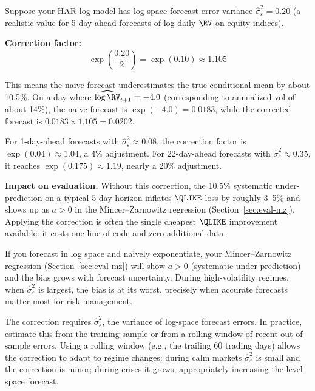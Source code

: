 \begin{workedexample}
Suppose your HAR-log model has log-space forecast error variance $\hat{\sigma}^2_\varepsilon = 0.20$ (a realistic value for 5-day-ahead forecasts of log daily $\RV$ on equity indices).

\textbf{Correction factor:}
\[
\exp\!\left(\frac{0.20}{2}\right) = \exp(0.10) \approx 1.105
\]

This means the naive forecast underestimates the true conditional mean by about 10.5\%.
On a day where $\widehat{\log \RV}_{t+1} = -4.0$ (corresponding to annualized vol of about 14\%), the naive forecast is $\exp(-4.0) = 0.0183$, while the corrected forecast is $0.0183 \times 1.105 = 0.0202$.

For 1-day-ahead forecasts with $\hat{\sigma}^2_\varepsilon \approx 0.08$, the correction factor is $\exp(0.04) \approx 1.04$, a 4\% adjustment.
For 22-day-ahead forecasts with $\hat{\sigma}^2_\varepsilon \approx 0.35$, it reaches $\exp(0.175) \approx 1.19$, nearly a 20\% adjustment.

\textbf{Impact on evaluation.}
Without this correction, the 10.5\% systematic under-prediction on a typical 5-day horizon inflates $\QLIKE$ loss by roughly 3--5\% and shows up as $a > 0$ in the Mincer--Zarnowitz regression (Section~\ref{sec:eval-mz}).
Applying the correction is often the single cheapest $\QLIKE$ improvement available: it costs one line of code and zero additional data.
\end{workedexample}

\begin{warning}
If you forecast in log space and naively exponentiate, your Mincer--Zarnowitz regression (Section~\ref{sec:eval-mz}) will show $a > 0$ (systematic under-prediction) and the bias grows with forecast uncertainty.
During high-volatility regimes, when $\hat{\sigma}^2_\varepsilon$ is largest, the bias is at its worst, precisely when accurate forecasts matter most for risk management.
\end{warning}

\begin{keyidea}
The correction requires $\hat{\sigma}^2_\varepsilon$, the variance of log-space forecast errors.
In practice, estimate this from the training sample or from a rolling window of recent out-of-sample errors.
Using a rolling window (e.g., the trailing 60 trading days) allows the correction to adapt to regime changes: during calm markets $\hat{\sigma}^2_\varepsilon$ is small and the correction is minor; during crises it grows, appropriately increasing the level-space forecast.
\end{keyidea}

